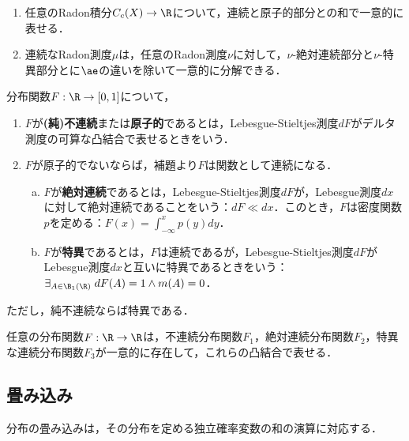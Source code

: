 \documentclass[uplatex,dvipdfmx]{jsreport}
\begin{document}
\begin{lemma}[Lebesgue分解]\mbox{}
    \begin{enumerate}
        \item 任意のRadon積分$C_c(X)\to\R$について，連続と原子的部分との和で一意的に表せる．
        \item 連続なRadon測度$\mu$は，任意のRadon測度$\nu$に対して，$\nu$-絶対連続部分と$\nu$-特異部分とに$\ae$の違いを除いて一意的に分解できる．
    \end{enumerate}
\end{lemma}

\begin{definition}
    分布関数$F:\R\to[0,1]$について，
    \begin{enumerate}
        \item $F$が\textbf{(純)不連続}または\textbf{原子的}であるとは，Lebesgue-Stieltjes測度$dF$がデルタ測度の可算な凸結合で表せるときをいう．
        \item $F$が原子的でないならば，補題より$F$は関数として連続になる．
        \begin{enumerate}[(a)]
            \item $F$が\textbf{絶対連続}であるとは，Lebesgue-Stieltjes測度$dF$が，Lebesgue測度$dx$に対して絶対連続であることをいう：$dF\ll dx$．このとき，$F$は密度関数$p$を定める：$F(x)=\int_{-\infty}^xp(y)dy$．
            \item $F$が\textbf{特異}であるとは，$F$は連続であるが，Lebesgue-Stieltjes測度$dF$がLebesgue測度$dx$と互いに特異であるときをいう：$\exists_{A\in\B_1(\R)}\;dF(A)=1\land m(A)=0$．
        \end{enumerate}
    \end{enumerate}
    ただし，純不連続ならば特異である．
\end{definition}

\begin{theorem}
    任意の分布関数$F:\R\to\R$は，不連続分布関数$F_1$，絶対連続分布関数$F_2$，特異な連続分布関数$F_3$が一意的に存在して，これらの凸結合で表せる．
\end{theorem}

\subsection{畳み込み}

\begin{tcolorbox}[colframe=ForestGreen, colback=ForestGreen!10!white,breakable,colbacktitle=ForestGreen!40!white,coltitle=black,fonttitle=\bfseries\sffamily,
title=]
    分布の畳み込みは，その分布を定める独立確率変数の和の演算に対応する．
\end{tcolorbox}
\end{document}
